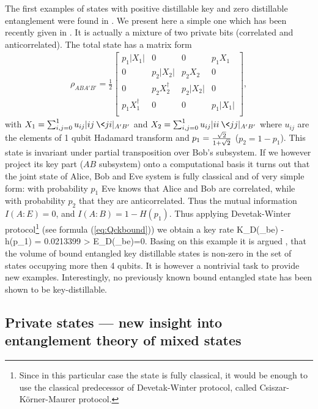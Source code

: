 \documentclass[twocolumn,aps,rmp]{revtex4}
\begin{document}
The first examples of states with positive distillable key and zero
distillable entanglement were found in \cite{pptkey,keyhuge}. We
present here a simple one which has been recently given in
\cite{smallkey}. It is actually a mixture of two private bits (correlated and anticorrelated). The total state has a
matrix form
\begin{eqnarray}
\rho_{ABA'B'}= \frac{1}{2}\left[ \begin{array}{cccc}
p_{1}|X_{1}| & 0 & 0 & p_{1}X_{1} \\
0 & p_{2}|X_{2}|& p_{2} X_{2} & 0 \\
0 & p_{2}X_{2}^{\dagger} & p_{2} |X_{2}| & 0\\
p_{1}X_{1}^{\dagger} & 0 & 0 & p_{1}|X_{1}|\\
\end{array}
\right],
\label{standform}
\end{eqnarray}
with $X_1 = \sum_{i,j=0}^1 u_{ij} |ij\>\<ji|_{A'B'}$ and $X_2 =
\sum_{i,j=0}^{1} u_{ij} |ii\>\<jj|_{A'B'}$ where $u_{ij}$ are the elements
of 1 qubit Hadamard transform and $ p_1 = {\sqrt{2}\over 1 +
\sqrt{2}}$ ($p_2=1-p_1$). This state is invariant under partial
transposition over Bob's subsystem. If we however project its key
part ($AB$ subsystem) onto a computational basis it turns out that
the joint state of Alice, Bob and Eve system is fully classical and of very
simple form: with probability $p_1$ Eve knows that Alice and
Bob are correlated, while with probability $p_2$ that they are
anticorrelated. Thus the mutual information $I(A:E)=0$, and
$I(A:B)=1-H(p_1)$. Thus applying Devetak-Winter
protocol\footnote{Since in  this particular case the state is fully
classical, it would be  enough to use the classical predecessor  of
Devetak-Winter protocol, called Csiszar-K{\"o}rner-Maurer protocol.}
(see formula (\ref{eq:Qckbound})) we obtain a key rate \be
K_D(\rho_{be})  - h(p_1) = 0.0213399 > E_D(\rho_{be})=0. \ee
Basing on this example it is argued \cite{smallkey}, that the volume
of bound entangled key distillable states is non-zero in the set of
states occupying more then 4 qubits. It is however a nontrivial task
to provide new examples. Interestingly, no previously known bound
entangled state has been shown to be key-distillable.

\subsection{Private states --- new insight into
entanglement theory of mixed states}
\end{document}
